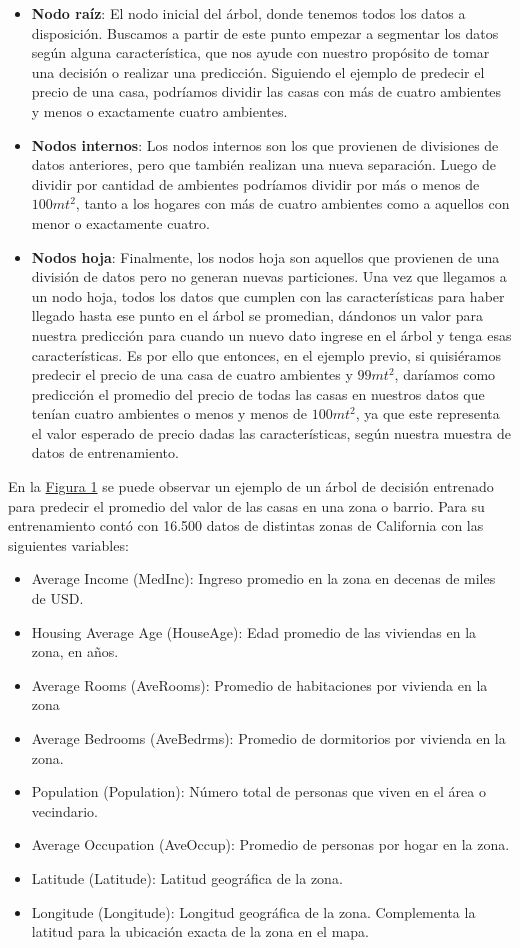 \begin{itemize}
    \item \textbf{Nodo raíz}: El nodo inicial del árbol, donde tenemos todos los datos a disposición. Buscamos a partir de este punto empezar a segmentar los datos según alguna característica, que nos ayude con nuestro propósito de tomar una decisión o realizar una predicción. Siguiendo el ejemplo de predecir el precio de una casa, podríamos dividir las casas con más de cuatro ambientes y menos o exactamente cuatro ambientes.
    \item \textbf{Nodos internos}: Los nodos internos son los que provienen de divisiones de datos anteriores, pero que también realizan una nueva separación. Luego de dividir por cantidad de ambientes podríamos dividir por más o menos de $100mt^{2}$, tanto a los hogares con más de cuatro ambientes como a aquellos con menor o exactamente cuatro.
    \item \textbf{Nodos hoja}: Finalmente, los nodos hoja son aquellos que provienen de una división de datos pero no generan nuevas particiones. Una vez que llegamos a un nodo hoja, todos los datos que cumplen con las características para haber llegado hasta ese punto en el árbol se promedian, dándonos un valor para nuestra predicción para cuando un nuevo dato ingrese en el árbol y tenga esas características. Es por ello que entonces, en el ejemplo previo, si quisiéramos predecir el precio de una casa de cuatro ambientes y $99mt^{2}$, daríamos como predicción el promedio del precio de todas las casas en nuestros datos que tenían cuatro ambientes o menos y menos de $100mt^{2}$, ya que este representa el valor esperado de precio dadas las características, según nuestra muestra de datos de entrenamiento.
\end{itemize}

En la \hyperref[figure1]{Figura 1} se puede observar un ejemplo de un árbol de decisión entrenado para predecir el promedio del valor de las casas en una zona o barrio. Para su entrenamiento contó con 16.500 datos de distintas zonas de California con las siguientes variables:

\begin{itemize}
    \item Average Income (MedInc): Ingreso promedio en la zona en decenas de miles de USD.
    \item Housing Average Age (HouseAge): Edad promedio de las viviendas en la zona, en años.
    \item Average Rooms (AveRooms): Promedio de habitaciones por vivienda en la zona
    \item Average Bedrooms (AveBedrms): Promedio de dormitorios por vivienda en la zona.
    \item Population (Population): Número total de personas que viven en el área o vecindario.
    \item Average Occupation (AveOccup): Promedio de personas por hogar en la zona.
    \item Latitude (Latitude): Latitud geográfica de la zona.
    \item Longitude (Longitude): Longitud geográfica de la zona. Complementa la latitud para la ubicación exacta de la zona en el mapa.
\end{itemize}

